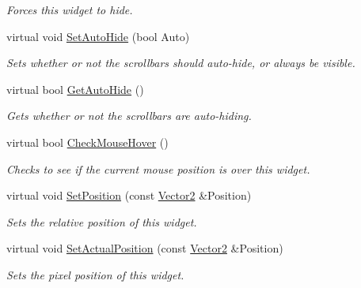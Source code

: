 \begin{DoxyCompactItemize}
\begin{DoxyCompactList}\small\item\em Forces this widget to hide. \item\end{DoxyCompactList}\item 
virtual void \hyperlink{classphys_1_1UI_1_1ScrolledCellGrid_ab3b8ac3f85185c1a9236cf80569659d8}{SetAutoHide} (bool Auto)
\begin{DoxyCompactList}\small\item\em Sets whether or not the scrollbars should auto-\/hide, or always be visible. \item\end{DoxyCompactList}\item 
virtual bool \hyperlink{classphys_1_1UI_1_1ScrolledCellGrid_ac45c0e5d0ecd6f032bfa2ec630394b96}{GetAutoHide} ()
\begin{DoxyCompactList}\small\item\em Gets whether or not the scrollbars are auto-\/hiding. \item\end{DoxyCompactList}\item 
virtual bool \hyperlink{classphys_1_1UI_1_1ScrolledCellGrid_a976e99e204f912d82712872e4e80b833}{CheckMouseHover} ()
\begin{DoxyCompactList}\small\item\em Checks to see if the current mouse position is over this widget. \item\end{DoxyCompactList}\item 
virtual void \hyperlink{classphys_1_1UI_1_1ScrolledCellGrid_aef62a124cb71b39bc73bda770741882f}{SetPosition} (const \hyperlink{classphys_1_1Vector2}{Vector2} \&Position)
\begin{DoxyCompactList}\small\item\em Sets the relative position of this widget. \item\end{DoxyCompactList}\item 
virtual void \hyperlink{classphys_1_1UI_1_1ScrolledCellGrid_aceff3ee36c2677d55e1a4e355611eef9}{SetActualPosition} (const \hyperlink{classphys_1_1Vector2}{Vector2} \&Position)
\begin{DoxyCompactList}\small\item\em Sets the pixel position of this widget. \item\end{DoxyCompactList}\item 

\end{DoxyCompactItemize}
